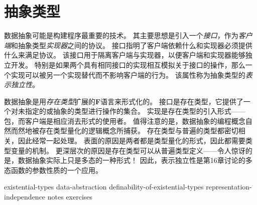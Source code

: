 ﻿\chapter{抽象类型}

数据抽象可能是构建程序最重要的技术。
其主要思想是引入一个\textit{接口}，作为\textit{客户端}和抽象类型\textit{实现器}之间的协议。
接口指明了客户端依赖什么和实现器必须提供什么来满足协议。
该接口用于隔离客户端与实现器，以便客户端和实现器能够独立开发。
特别是如果两个具有相同接口的实现相互模拟关于接口的操作，那么一个实现可以被另一个实现替代而不影响客户端的行为。
该属性称为抽象类型的\textit{表示独立性}。

数据抽象是用\textit{存在类型}扩展的\textbf{F}语言来形式化的。
接口是存在类型，它提供了一个对未指定的或抽象的类型进行操作的集合。
实现是存在类型的引入形式——包，而客户端是相应消去形式的使用者。
值得注意的是，数据抽象的编程概念自然而然地被存在类型量化的逻辑概念所捕获。
存在类型与普遍的类型都密切相关，因此经常一起处理。
表面的原因是两者都是类型量化的形式，因此都需要类型变量的机制。
更深层次的原因是存在类型可以从普遍类型定义——令人惊讶的是，数据抽象实际上只是多态的一种形式！
因此，表示独立性是第16章讨论的多态函数的参数性质的一个应用。


{existential-types}
{data-abstraction}
{definability-of-existential-types}
{representation-independence}
{notes}
{exercises}